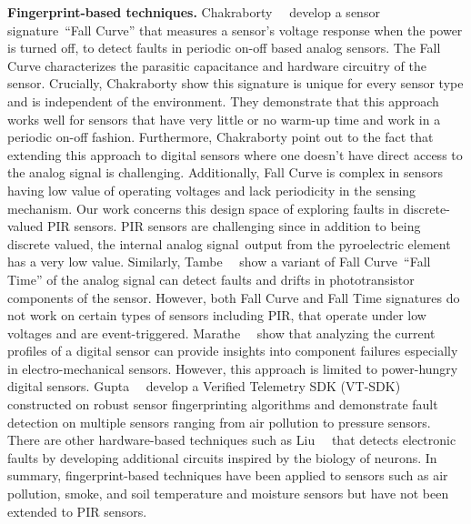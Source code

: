 \textbf{Fingerprint-based techniques.} %
Chakraborty~\etal~\cite{chakraborty2018fall} develop a sensor signature~\viz ``Fall Curve'' that measures a sensor's voltage response when the power is turned off, to detect faults in periodic on-off based analog sensors. 
%
The Fall Curve characterizes the parasitic capacitance and hardware circuitry of the sensor. Crucially, Chakraborty \etal show this signature is unique for every sensor type and is independent of the environment. They demonstrate that this approach works well for sensors that have very little or no warm-up time and work in a periodic on-off fashion. 
%
Furthermore, Chakraborty \etal \cite{chakraborty2018fall} point out to the fact that extending this approach to digital sensors where one doesn't have direct access to the analog signal is challenging. Additionally, Fall Curve is complex in sensors having low value of operating voltages and lack periodicity in the sensing mechanism. Our work concerns this design space of exploring faults in discrete-valued PIR sensors. PIR sensors are challenging since in addition to being discrete valued, the internal analog signal~\viz output from the pyroelectric element has a very low value. 
%
Similarly, Tambe~\etal~\cite{10.1145/3458864.3466869} show a variant of Fall Curve~\ie ``Fall Time'' of the analog signal can detect faults and drifts in phototransistor components of the sensor.
However, both Fall Curve and Fall Time signatures do not work on certain types of sensors including PIR, that operate under low voltages and are event-triggered. Marathe~\etal~\cite{marathe2021currentsense} show that analyzing the current profiles of a digital sensor can provide insights into component failures especially in electro-mechanical sensors. However, this approach is limited to power-hungry digital sensors. %
%
Gupta~\etal~\cite{10.1145/3576842.3582386} develop a Verified Telemetry SDK (VT-SDK) constructed on robust sensor fingerprinting algorithms and demonstrate fault detection on multiple sensors ranging from air pollution to pressure sensors.
%
There are other hardware-based techniques such as Liu~\etal~\cite{Liu_Huang_Luo_Harkin_McDaid_2019} that detects electronic faults by developing additional circuits inspired by the biology of neurons.
%
In summary, fingerprint-based techniques have been applied to sensors such as air pollution, smoke, and soil temperature and moisture sensors but have not been extended to PIR sensors.

